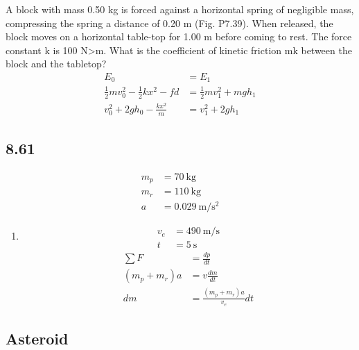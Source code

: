 \documentclass{article}
\begin{document}
A block with mass 0.50 kg is forced against a horizontal spring of negligible mass, compressing the spring a distance of 0.20 m (Fig. P7.39). When released, the block moves on a horizontal table-top for 1.00 m before coming to rest. The force constant k is 100 N>m. What is the coefficient of kinetic friction mk between the block and the tabletop?
\begin{align*}
	E_0 & = E_1 \\
	\frac{1}{2}mv_0^2 - \frac{1}{2}kx^2 - fd & = \frac{1}{2}mv_1^2 + mgh_1 \\
	v_0^2 + 2gh_0 - \frac{ kx^2 }{ m } & = v_1^2 + 2gh_1
\end{align*}

\subsection{8.61}

\begin{align*}
	m_p & = \SI{70}{\kilogram} \\
	m_r & = \SI{110}{\kilogram} \\
	a & = \SI{0.029}{\meter \per \second \squared}
\end{align*}
\begin{enumerate}[label = \textbf{(\alph*)}]
	\item
		\begin{align*}
			v_e & = \SI{490}{\meter \per \second} \\
			t & = \SI{5}{\second}
		\end{align*}
		\begin{align*}
			\sum F & = \frac{dp}{dt} \\
			(m_p + m_r)a & = v\frac{dm}{dt} \\
			dm & = \frac{ (m_p + m_r)a }{ v_e }dt
		\end{align*}
\end{enumerate}

\newpage
\subsection{Asteroid}
\end{document}
